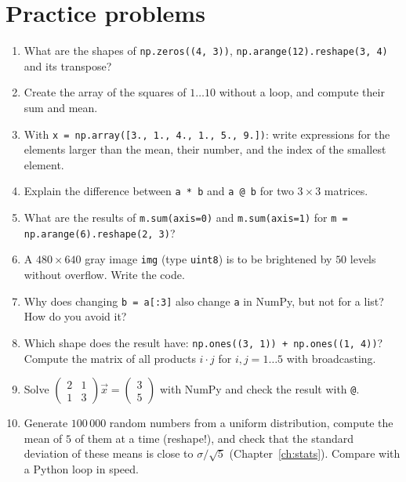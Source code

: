 \section*{Practice problems}
\begin{enumerate}[label=\textbf{\thechapter.\arabic*}]
  \item What are the shapes of \texttt{np.zeros((4, 3))}, \texttt{np.arange(12).reshape(3, 4)} and its transpose?
  \item Create the array of the squares of $1\dots10$ without a loop, and compute their sum and mean.
  \item With \texttt{x = np.array([3., 1., 4., 1., 5., 9.])}: write expressions for the elements larger than the mean, their number, and the index of the smallest element.
  \item Explain the difference between \texttt{a * b} and \texttt{a @ b} for two $3\times3$ matrices.
  \item What are the results of \verb!m.sum(axis=0)! and \verb!m.sum(axis=1)! for \verb!m = np.arange(6).reshape(2, 3)!?
  \item A $480\times640$ gray image \texttt{img} (type \texttt{uint8}) is to be brightened by $50$ levels without overflow. Write the code.
  \item Why does changing \texttt{b = a[:3]} also change \texttt{a} in NumPy, but not for a list? How do you avoid it?
  \item Which shape does the result have: \verb!np.ones((3, 1)) + np.ones((1, 4))!? Compute the matrix of all products $i\cdot j$ for $i,j=1\dots5$ with broadcasting.
  \item Solve $\begin{pmatrix}2&1\\1&3\end{pmatrix}\vec{x}=\begin{pmatrix}3\\5\end{pmatrix}$ with NumPy and check the result with \texttt{@}.
  \item[\textbf{\thechapter.10}$\star$] Generate $100\,000$ random numbers from a uniform distribution, compute the mean of $5$ of them at a time (reshape!), and check that the standard deviation of these means is close to $\sigma/\sqrt5$ (Chapter~\ref{ch:stats}). Compare with a Python loop in speed.
\end{enumerate}
